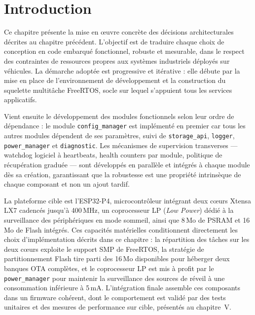 \newpage

\section{Introduction}
\label{sec:intro_ch4}

Ce chapitre présente la mise en œuvre concrète des décisions
architecturales décrites au chapitre précédent. L'objectif est de
traduire chaque choix de conception en code embarqué fonctionnel,
robuste et mesurable, dans le respect des contraintes de ressources
propres aux systèmes industriels déployés sur véhicules. La démarche
adoptée est progressive et itérative : elle débute par la mise en
place de l'environnement de développement et la construction du
squelette multitâche FreeRTOS, socle sur lequel s'appuient tous les
services applicatifs.

Vient ensuite le développement des modules fonctionnels selon leur
ordre de dépendance : le module \texttt{config\_manager} est
implémenté en premier car tous les autres modules dépendent de ses
paramètres, suivi de \texttt{storage\_api}, \texttt{logger},
\texttt{power\_manager} et \texttt{diagnostic}. Les mécanismes de
supervision transverses --- watchdog logiciel à heartbeats, health
counters par module, politique de récupération graduée --- sont
développés en parallèle et intégrés à chaque module dès sa création,
garantissant que la robustesse est une propriété intrinsèque de chaque
composant et non un ajout tardif.

La plateforme cible est l'ESP32-P4, microcontrôleur intégrant deux
cœurs Xtensa LX7 cadencés jusqu'à 400\,MHz, un coprocesseur LP
(\textit{Low Power}) dédié à la surveillance des périphériques en
mode sommeil, ainsi que 8\,Mo de PSRAM et 16\,Mo de Flash intégrés.
Ces capacités matérielles conditionnent directement les choix
d'implémentation décrits dans ce chapitre : la répartition des tâches
sur les deux cœurs exploite le support SMP de FreeRTOS, la stratégie
de partitionnement Flash tire parti des 16\,Mo disponibles pour
héberger deux banques OTA complètes, et le coprocesseur LP est mis
à profit par le \texttt{power\_manager} pour maintenir la surveillance
des sources de réveil à une consommation inférieure à 5\,mA.
L'intégration finale assemble ces composants dans un firmware cohérent,
dont le comportement est validé par des tests unitaires et des mesures
de performance sur cible, présentés au chapitre~V.
